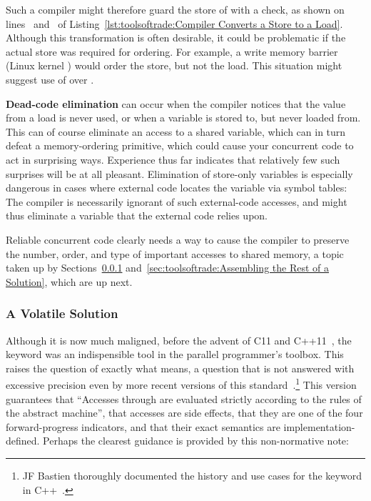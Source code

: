 \begin{fcvref}
Such a compiler might therefore guard the store of 
with a check, as shown on lines~ and~ of
Listing~\ref{lst:toolsoftrade:Compiler Converts a Store to a Load}.
Although this transformation is often desirable, it could be problematic
if the actual store was required for ordering.
For example, a write memory barrier (Linux kernel ) would
order the store, but not the load.
This situation might suggest use of  over
.
\end{fcvref}

{\bf Dead-code elimination} can occur when the compiler notices that
the value from a load is never used, or when a variable is stored to,
but never loaded from.
This can of course eliminate an access to a shared variable, which
can in turn defeat a memory-ordering primitive, which could cause your
concurrent code to act in surprising ways.
Experience thus far indicates that relatively few such surprises will
be at all pleasant.
Elimination of store-only variables is especially dangerous in cases
where external code locates the variable via symbol tables: The
compiler is necessarily ignorant of such external-code accesses, and
might thus eliminate a variable that the external code relies upon.

Reliable concurrent code clearly needs a way to cause the compiler to
preserve the number, order, and type of important accesses to shared
memory, a topic taken up by
Sections~\ref{sec:toolsoftrade:A Volatile Solution}
and~\ref{sec:toolsoftrade:Assembling the Rest of a Solution},
which are up next.

\subsubsection{A Volatile Solution}
\label{sec:toolsoftrade:A Volatile Solution}

Although it is now much maligned, before the advent of C11 and
C++11~\cite{PeteBecker2011N3242}, the  keyword was an
indispensible tool in the parallel programmer's toolbox.
This raises the question of exactly what  means,
a question that is not answered with excessive precision even
by more recent versions of this standard~\cite{RichardSmith2019N4800}.\footnote{
	JF Bastien thoroughly documented the history and use cases
	for the  keyword in
	C++~\cite{JFBastien2018DeprecatingVolatile}.}
This version guarantees that ``Accesses through 
 are evaluated strictly according to the rules of the
abstract machine'',
that  accesses are side effects,
that they are one of the four forward-progress indicators,
and that their exact semantics are implementation-defined.
Perhaps the clearest guidance is provided by this non-normative note:

